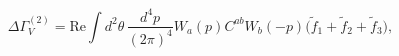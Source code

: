 \begin{equation}\label{Two_Loop_Effective_Action_DRED}
\Delta\Gamma^{(2)}_{V} = \mbox{Re} \int d^2\theta\,
\frac{d^4p}{(2\pi)^4} W_a(p) C^{ab} W_b(-p)
\Big(\tilde f_1 + \tilde f_2 + \tilde f_3 \Big),
\end{equation}

